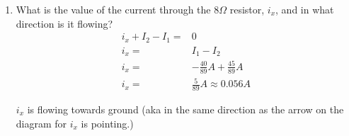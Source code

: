 \documentclass[12pt,letterpaper,titlepage]{article}
\begin{document}
\begin{raggedright}
\begin{enumerate}[label=\Alph*)]
\item What is the value of the current through the $8\Omega$ resistor, $i_x$, and in what direction is it flowing?
\begin{align*}
    i_x + I_2 - I_1 =& 0
\\  i_x =& I_1 - I_2
\\  i_x =& -\frac{40}{89}A +\frac{45}{89}A
\\  i_x =& \frac{5}{89}A \approx 0.056A
\end{align*}

$i_x$ is flowing towards ground (aka in the same direction as the arrow on the diagram for $i_x$ is pointing.)

\end{enumerate}

\end{raggedright}
\end{document}
